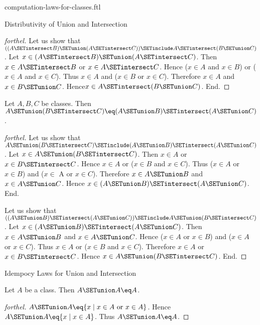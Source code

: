 \documentclass{naproche-library}
\begin{document}
\begin{smodule}[title=Computation Laws For Classes]{computation-laws-for-classes.ftl}
\begin{sfragment}{Distributivity of Union and Intersection}
\begin{proof}[forthel]
    Let us show that $((A \SETintersect B) \SETunion (A \SETintersect C)) \SETinclude A \SETintersect (B \SETunion C)$. %
      Let $x \in (A \SETintersect B) \SETunion (A \SETintersect C)$.
      Then $x \in A \SETintersect B$ or $x \in A \SETintersect C$.
      Hence ($x \in A$ and $x \in B$) or ($x \in A$ and $x \in C$).
      Thus $x \in A$ and ($x \in B$ or $x \in C$).
      Therefore $x \in A$ and $x \in B \SETunion C$.
      Hence$ x \in A \SETintersect (B \SETunion C)$.
    End.
  \end{proof}

  \begin{proposition}[forthel,id=FOUNDATIONS_02_5937390721957888]
    Let $A, B, C$ be classes.
    Then $A \SETunion (B \SETintersect C) \eq (A \SETunion B) \SETintersect (A \SETunion C)$.
  \end{proposition}
  \begin{proof}[forthel]
    Let us show that $A \SETunion (B \SETintersect C) \SETinclude (A \SETunion B) \SETintersect (A \SETunion C)$.
      Let $x \in A \SETunion (B \SETintersect C)$.
      Then $x \in A$ or $x \in B \SETintersect C$.
      Hence $x \in A$ or ($x \in B$ and $x \in C$).
      Thus ($x \in A$ or $x \in B$) and ($x \in$ A or $x \in C$).
      Therefore $x \in A \SETunion B$ and $x \in A \SETunion C$.
      Hence $x \in (A \SETunion B) \SETintersect (A \SETunion C)$.
    End.

    Let us show that $((A \SETunion B) \SETintersect (A \SETunion C)) \SETinclude A \SETunion (B \SETintersect C)$. %
      Let $x \in (A \SETunion B) \SETintersect (A \SETunion C)$.
      Then $x \in A \SETunion B$ and $x \in A \SETunion C$.
      Hence ($x \in A$ or $x \in B$) and ($x \in A$ or $x \in C$).
      Thus $x \in A$ or ($x \in B$ and $x \in C$).
      Therefore $x \in A$ or $x \in B \SETintersect C$.
      Hence $x \in A \SETunion (B \SETintersect C)$.
    End.
  \end{proof}
\end{sfragment}

\begin{sfragment}{Idempocy Laws for Union and Intersection}
  \begin{proposition}[forthel,id=FOUNDATIONS_02_2096996737351680]
    Let $A$ be a class.
    Then $A \SETunion A \eq A$.
  \end{proposition}
  \begin{proof}[forthel]
    $A \SETunion A \eq \{x \mid x \in A\text{ or }x \in A \}$.
    Hence $A \SETunion A \eq \{ x \mid x \in A \}$.
    Thus $A \SETunion A \eq A$.
  \end{proof}


\end{sfragment}
\end{smodule}
\end{document}
